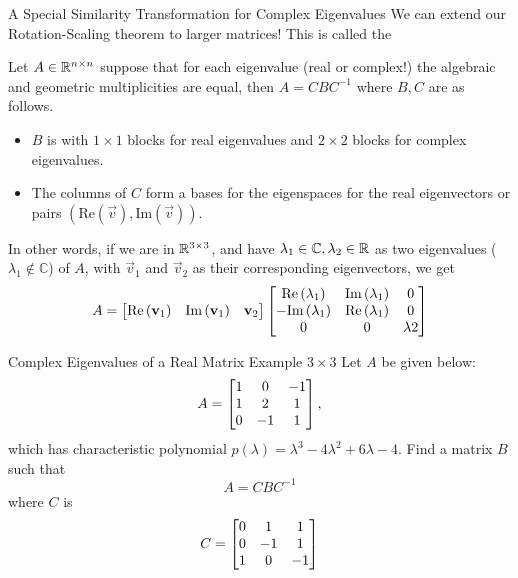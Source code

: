 \documentclass[xcoler=dvipsnames, aspectratio=169]{beamer}
\newcommand{\C}{\mathbb{C}}
\renewcommand{\Re}[1]{\textrm{Re}\left(#1\right)}
\renewcommand{\Im}[1]{\textrm{Im}\left(#1\right)}
\begin{document}
    \begin{frame}{A Special Similarity Transformation for Complex Eigenvalues}
        \small
        We can extend our Rotation-Scaling theorem to larger matrices! This is called the 
        \begin{theorem}
            Let $A\in\mathbb{R}^{n\times n}$ suppose that for each eigenvalue (real or complex!) the algebraic
            and geometric multiplicities are equal, then $A=CBC^{-1}$ where $B,C$ are as follows.\pause
            \begin{itemize}
                \pause\item $B$ is  with $1\times 1$ blocks for real 
                    eigenvalues and $2\times 2$ blocks for complex eigenvalues.
                \pause\item The columns of $C$ form a bases for the eigenspaces for the real
                    eigenvectors or pairs $(\Re{\vec{v}}, \Im{\vec{v}})$.
            \end{itemize}
        \end{theorem}\pause
        In other words, if we are in $\mathbb{R}^{3\times 3}$, and have $\lambda_1\in\C,\lambda_2\in\R$ as 
        two eigenvalues ($\lambda_1\not\in\C$) of $A$, with $\vec{v}_1$ and $\vec{v}_2$ as their
        corresponding eigenvectors\pause, we get
        \[
            A = \bMat{
                    \Re{\vec{v}_1} & \Im{\vec{v}_1} & \vec{v}_2
                }\bMat{
                    \Re{\lambda_1} & \Im{\lambda_1} & 0\\
                    -\Im{\lambda_1}& \Re{\lambda_1} & 0\\
                    0 & 0 & \lambda2
                }
        \]
    \end{frame}
    \begin{frame}{Complex Eigenvalues of a Real Matrix Example $3\times 3$}
    Let $A$ be given below:
    \[
        A = \begin{bmatrix}
            1 & 0 & -1\\
            1 & 2 &  1\\
            0 &-1 &  1
        \end{bmatrix},
    \]
    which has characteristic polynomial 
    $p(\lambda) = \lambda^3 - 4\lambda^2 + 6\lambda - 4$. Find a matrix $B$ such that
    \[
        A = CBC^{-1}
    \]
    where $C$ is 
    \[
        C = \begin{bmatrix}
            0 & 1 & 1\\
            0 &-1 & 1\\
            1 & 0 &-1
        \end{bmatrix}
    \]
    \end{frame}
\end{document}
